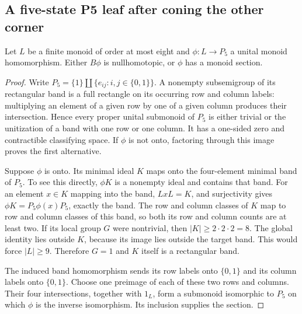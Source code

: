 \subsection{A five-state P5 leaf after coning the other corner}

\begin{lemma}
\label{CP2:A-small-map-to-P5}
Let $L$ be a finite monoid of order at most eight and
$\phi:L\to P_5$ a unital monoid homomorphism. Either
$B\phi$ is nullhomotopic, or $\phi$ has a monoid section.
\end{lemma}
\begin{proof}
Write $P_5=\{1\}\amalg\{e_{ij}:i,j\in\{0,1\}\}$.
A nonempty subsemigroup of its rectangular band is a full
rectangle on its occurring row and column labels: multiplying
an element of a given row by one of a given column produces
their intersection. Hence every proper unital submonoid of
$P_5$ is either trivial or the unitization of a band with one
row or one column. It has a one-sided zero and contractible
classifying space. If $\phi$ is not onto, factoring through
this image proves the first alternative.

Suppose $\phi$ is onto. Its minimal ideal $K$ maps onto the
four-element minimal band of $P_5$. To see this directly,
$\phi K$ is a nonempty ideal and contains that band. For
an element $x\in K$ mapping into the band, $LxL=K$, and
surjectivity gives $\phi K=P_5\phi(x)P_5$, exactly the band.
The row and column classes of $K$ map to row and column
classes of this band, so both its row and column counts are
at least two. If its local group $G$ were nontrivial, then
$|K|\geq2\cdot2\cdot2=8$. The global identity lies outside
$K$, because its image lies outside the target band. This
would force $|L|\geq9$. Therefore $G=1$ and $K$ itself is a
rectangular band.

The induced band homomorphism sends its row labels onto
$\{0,1\}$ and its column labels onto $\{0,1\}$. Choose one
preimage of each of these two rows and columns. Their four
intersections, together with $1_L$, form a submonoid
isomorphic to $P_5$ on which $\phi$ is the inverse
isomorphism. Its inclusion supplies the section.
\end{proof}

